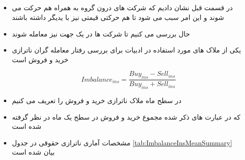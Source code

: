 \documentclass[12pt, a4paper]{article}
\begin{document}
\begin{itemize}
%								
%								
%	
%	
%									
\end{itemize}

\FloatBarrier




\FloatBarrier







\FloatBarrier


 \subsection{}
 \begin{itemize}
 	\item 
 	در قسمت قبل نشان دادیم که شرکت های درون گروه به همراه هم حرکت می شوند و این امر سبب می شود تا هم حرکتی قیمتی نیز با یدیگر داشته باشند
 	\item
 	حال بررسی می کنیم تا شرکت ها در یک جهت نیز معامله شوند
 	\item
 	یکی از ملاک های مورد استفاده در ادبیات برای بررسی رفتار معامله گران  ناترازی خرید و فروش است
 	
 
 		\begin{equation}
 			Imbalance_{ins} = \frac{Buy_{ins} - Sell_{ins}}{Buy_{ins} + Sell_{ins}}
 		\end{equation}

 	\item 
 	در سطح ماه ملاک ناترازی خرید و فروش را تعریف می کنیم
 	\item 
 	که در عبارت های ذکر شده مجموع خرید و فروش در سطح یک ماه در نظر گرفته شده است
 	\item 
 	مشخصات آماری ناترازی حقوقی در جدول 
 	\ref{tab:ImbalanceInsMeanSummary}
 	بیان شده است
  	\begin{LTR}
 \end{LTR}

 \end{itemize}
 \FloatBarrier
 
\end{document}
